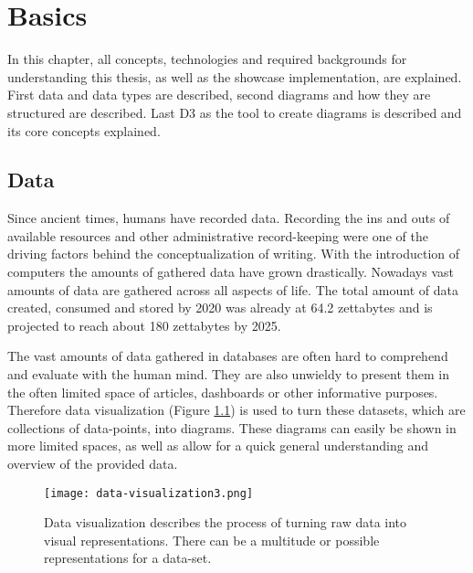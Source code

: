 \chapter{Basics}

In this chapter, all concepts, technologies and required backgrounds for understanding this thesis, as well as the showcase implementation, are explained. First data and data types are described, second diagrams and how they are structured are described. Last D3 as the tool to create diagrams is described and its core concepts explained.


\section{Data}

Since ancient times, humans have recorded data. Recording the ins and outs of available resources and other administrative record-keeping were one of the driving factors behind the conceptualization of writing\cite{senner1991origins}.
With the introduction of computers the amounts of gathered data have grown drastically. Nowadays vast amounts of data are gathered across all aspects of life. The total amount of data created, consumed and stored by 2020 was already at 64.2 zettabytes and is projected to reach about 180 zettabytes by 2025\cite{statista_2022}.

The vast amounts of data gathered in databases are often hard to comprehend and evaluate with the human mind. They are also unwieldy to present them in the often limited space of articles, dashboards or other informative purposes. Therefore data visualization (Figure \ref{fig:data-visualization}) is used to turn these datasets, which are collections of data-points, into diagrams. These diagrams can easily be shown in more limited spaces, as well as allow for a quick general understanding and overview of the provided data.

\begin{figure}
    \texttt{[image: data-visualization3.png]}
    \captionsetup{width=0.9\textwidth}
    \caption[data-visualization]{Data visualization describes the process of turning raw data into visual representations. There can be a multitude or possible representations for a data-set.}
    \label{fig:data-visualization}
\end{figure}

